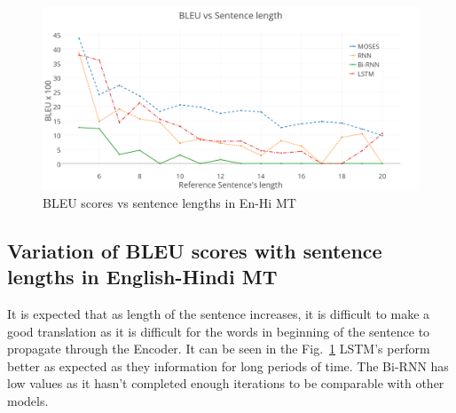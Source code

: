 \documentclass[12pt]{report}
\begin{document}

\begin{figure}
\centering
\includegraphics[width=6.5in]{2.png}
\caption{BLEU scores vs sentence lengths in En-Hi MT}
\vspace{-0.4cm}
\label{lenB}
\end{figure}

\subsection{Variation of BLEU scores with sentence lengths in English-Hindi MT}
It is expected that as length of the sentence increases, it is difficult to make a good translation as it is difficult for the words in beginning of the sentence to propagate through the Encoder. It can be seen in the Fig.~\ref{lenB} LSTM's perform better as expected as they information for long periods of time. The Bi-RNN has low values as it hasn't completed enough iterations to be comparable with other models.
\end{document}
